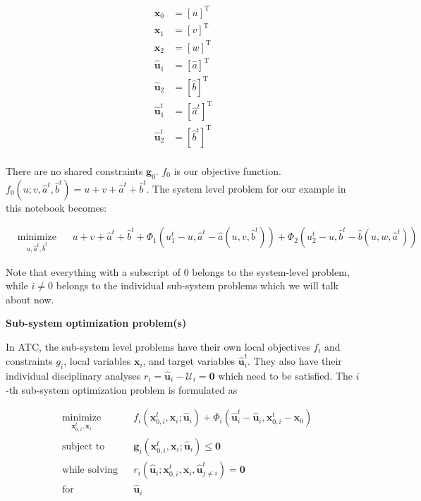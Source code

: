 \documentclass[11pt]{article}
\begin{document}
\begin{align*}
\mathbf{x}_0 & = \left[u\right]^\mathrm{T}\\
\mathbf{x}_1 & = \left[v\right]^\mathrm{T}\\
\mathbf{x}_2 & = \left[w\right]^\mathrm{T}\\
\hat{\mathbf{u}}_1 & = \left[\hat{a}\right]^\mathrm{T}\\
\hat{\mathbf{u}}_2 & = \left[\hat{b}\right]^\mathrm{T}\\
\hat{\mathbf{u}}_1^t & = \left[\hat{a}^t\right]^\mathrm{T}\\
\hat{\mathbf{u}}_2^t & = \left[\hat{b}^t\right]^\mathrm{T}\\
\end{align*}

There are no shared constraints \(\mathbf{g}_0\). \(f_0\) is our
objective function.
\(f_0(u;v,\hat{a}^t,\hat{b}^t) = u+v+\hat{a}^t+\hat{b}^t\). The system
level problem for our example in this notebook becomes:

\begin{equation*}
    \begin{aligned}
        & \underset{u,\hat{a}^t,\hat{b}^t}{\text{minimize}}
        & & u+v+\hat{a}^t+\hat{b}^t + \Phi_1(u_1^t - u, \hat{a}^t - \hat{a}(u,v,\hat{b}^t)) + \Phi_2(u_2^t - u, \hat{b}^t - \hat{b}(u,w,\hat{a}^t))
    \end{aligned}
    \tag{8}
\end{equation*}

Note that everything with a subscript of \(0\) belongs to the
system-level problem, while \(i\neq 0\) belongs to the individual
sub-system problems which we will talk about now.

\textbf{Sub-system optimization problem(s)}

In ATC, the sub-system level problems have their own local objectives
\(f_i\) and constraints \(g_i\), local variables \(\mathbf{x}_i\), and
target variables \(\hat{\mathbf{u}}_i^t\). They also have their
individual disciplinary analyses
\(r_i = \hat{\mathbf{u}}_i - \mathcal{U}_i = \mathbf{0}\) which need to
be satisfied. The \(i\)-th sub-system optimization problem is formulated
as

\begin{equation*}
    \begin{aligned}
        & \underset{\mathbf{x}_{0,i}^t,\mathbf{x}_i}{\text{minimize}}
        & & f_i(\mathbf{x}_{0,i}^t,\mathbf{x}_i;\hat{\mathbf{u}}_i) + \Phi_i(\hat{\mathbf{u}}_{i}^t - \hat{\mathbf{u}}_{i},\mathbf{x}_{0,i}^t - \mathbf{x}_{0})\\
        & \text{subject to}
        & & \mathbf{g}_i(\mathbf{x}_{0,i}^t,\mathbf{x}_i;\hat{\mathbf{u}}_i) \leq \mathbf{0}\\
        & \text{while solving}
        & & r_i(\hat{\mathbf{u}}_i;\mathbf{x}_{0,i}^t,\mathbf{x}_i,\hat{\mathbf{u}}_{j\neq i}^t) = \mathbf{0}\\
        & \text{for}
        & & \hat{\mathbf{u}}_i\\
    \end{aligned}
    \tag{9}
\end{equation*}
\end{document}
